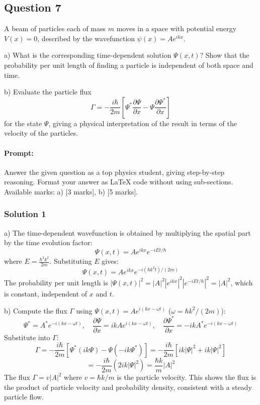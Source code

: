\documentclass{article}
\begin{document}
\subsection{Question 7}
A beam of particles each of mass $m$ moves in a space with potential energy $V(x) = 0$, described by the wavefunction $\psi(x) = A e^{ikx}$.  

a) What is the corresponding time-dependent solution $\Psi(x,t)$? Show that the probability per unit length of finding a particle is independent of both space and time.  

b) Evaluate the particle flux  
\[
\Gamma = -\frac{i \hbar}{2m} \left[ \Psi^* \frac{\partial \Psi}{\partial x} - \Psi \frac{\partial \Psi^*}{\partial x} \right]
\]
for the state $\Psi$, giving a physical interpretation of the result in terms of the velocity of the particles.


\paragraph{Prompt: \\} 
Answer the given question as a top physics student, giving step-by-step reasoning. Format your answer as LaTeX code without using sub-sections. Available marks: a) [3 marks], b) [5 marks].


\subsubsection{Solution 1}
a) The time-dependent wavefunction is obtained by multiplying the spatial part by the time evolution factor:
\[
\Psi(x,t) = A e^{ikx} e^{-iEt/\hbar}
\]
where \(E = \frac{\hbar^2 k^2}{2m}\). Substituting \(E\) gives:
\[
\Psi(x,t) = A e^{ikx} e^{-i(\hbar k^2 t)/(2m)}
\]
The probability per unit length is \(|\Psi(x,t)|^2 = |A|^2 \left|e^{ikx}\right|^2 \left|e^{-iEt/\hbar}\right|^2 = |A|^2\), which is constant, independent of \(x\) and \(t\).

b) Compute the flux \(\Gamma\) using \(\Psi(x,t) = A e^{i(kx - \omega t)}\) (\(\omega = \hbar k^2/(2m)\)):  
\[
\Psi^* = A^* e^{-i(kx - \omega t)}, \quad \frac{\partial \Psi}{\partial x} = ikA e^{i(kx - \omega t)}, \quad \frac{\partial \Psi^*}{\partial x} = -ikA^* e^{-i(kx - \omega t)}
\]
Substitute into \(\Gamma\):
\[
\Gamma = -\frac{i\hbar}{2m} \left[ \Psi^* (ik\Psi) - \Psi (-ik\Psi^*) \right] = -\frac{i\hbar}{2m} \left[ ik|\Psi|^2 + ik|\Psi|^2 \right]
\]
\[
= -\frac{i\hbar}{2m} (2ik|\Psi|^2) = \frac{\hbar k}{m} |A|^2
\]
The flux \(\Gamma = v |A|^2\) where \(v = \hbar k/m\) is the particle velocity. This shows the flux is the product of particle velocity and probability density, consistent with a steady particle flow.
\end{document}
